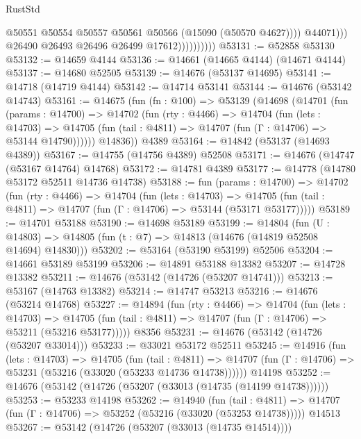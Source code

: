 \begin{lexlean}{RustStd}
\begin{coremodule}
                                  @50551
                                  @50554
                                  @50557
                                  @50561
                                  @50566
                                  (@15090 (@50570 @4627))))
                              @44071)))
                        @26490
                        @26493
                        @26496
                        @26499
                        @17612))))))))))
@53131 := @52858 @53130
@53132 := @14659 @4144
@53136 := @14661 (@14665 @4144) (@14671 @4144)
@53137 := @14680 @52505
@53139 := @14676 (@53137 @14695)
@53141 := @14718 (@14719 @4144)
@53142 := @14714 @53141
@53144 := @14676 (@53142 @14743)
@53161 := @14675
    (fun (fn : @100) =>
    @53139
      (@14698
        (@14701
          (fun (params : @14700) =>
          @14702
            (fun (rty : @4466) =>
            @14704
              (fun (lets : @14703) =>
              @14705 (fun (tail : @4811) => @14707 (fun (Γ : @14706) => @53144 @14790))))))
        @14836))
    @4389
@53164 := @14842 (@53137 (@14693 @4389))
@53167 := @14755 (@14756 @4389) @52508
@53171 := @14676 (@14747 (@53167 @14764) @14768)
@53172 := @14781 @4389
@53177 := @14778 (@14780 @53172 @52511 @14736 @14738)
@53188 := fun (params : @14700) =>
  @14702
    (fun (rty : @4466) =>
    @14704
      (fun (lets : @14703) =>
      @14705 (fun (tail : @4811) => @14707 (fun (Γ : @14706) => @53144 (@53171 @53177)))))
@53189 := @14701 @53188
@53190 := @14698 @53189
@53199 := @14804
    (fun (U : @14803) => @14805 (fun (t : @7) => @14813 (@14676 (@14819 @52508 @14694) @14830)))
@53202 := @53164 (@53190 @53199) @52506
@53204 := @14661 @53189 @53199
@53206 := @14891 @53188 @13382
@53207 := @14728 @13382
@53211 := @14676 (@53142 (@14726 (@53207 @14741)))
@53213 := @53167 (@14763 @13382)
@53214 := @14747 @53213
@53216 := @14676 (@53214 @14768)
@53227 := @14894
    (fun (rty : @4466) =>
    @14704
      (fun (lets : @14703) =>
      @14705 (fun (tail : @4811) => @14707 (fun (Γ : @14706) => @53211 (@53216 @53177)))))
    @8356
@53231 := @14676 (@53142 (@14726 (@53207 @33014)))
@53233 := @33021 @53172 @52511
@53245 := @14916
    (fun (lets : @14703) =>
    @14705
      (fun (tail : @4811) =>
      @14707 (fun (Γ : @14706) => @53231 (@53216 (@33020 (@53233 @14736 @14738))))))
    @14198
@53252 := @14676 (@53142 (@14726 (@53207 (@33013 (@14735 (@14199 @14738))))))
@53253 := @53233 @14198
@53262 := @14940
    (fun (tail : @4811) => @14707 (fun (Γ : @14706) => @53252 (@53216 (@33020 (@53253 @14738)))))
    @14513
@53267 := @53142 (@14726 (@53207 (@33013 (@14735 @14514))))

\end{coremodule}
\end{lexlean}
